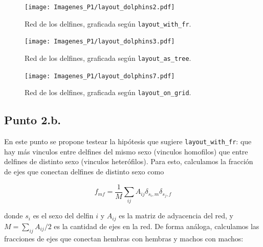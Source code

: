 \documentclass{article}
\begin{document}
\begin{figure}[!htb]
   \begin{minipage}{0.3\textwidth}
	\centering
	\texttt{[image: Imagenes\_P1/layout\_dolphins2.pdf]}
	\caption{Red de los delfines, graficada según \texttt{layout\_with\_fr}.}
	\label{pt2layoutsfr}
   \end{minipage}\hfill
   \begin{minipage}{0.3\textwidth}
	\centering
	\texttt{[image: Imagenes\_P1/layout\_dolphins3.pdf]}
	\caption{Red de los delfines, graficada seg\'un \texttt{layout\_as\_tree}.}
	\label{pt2layouttree}
   \end{minipage}\hfill
   \begin{minipage}{0.3\textwidth}
	\centering
	\texttt{[image: Imagenes\_P1/layout\_dolphins7.pdf]}
    \caption{Red de los delfines, graficada seg\'un \texttt{layout\_on\_grid}.}
	\label{pt2layoutgrid}
   \end{minipage}
\end{figure}


\subsection{Punto 2.b.}
En este punto se propone testear la hipótesis que sugiere \texttt{layout\_with\_fr}: que hay más vinculos entre delfines del mismo sexo (vinculos homofilos) que entre delfines de distinto sexo (vinculos heter\'ofilos). Para esto, calculamos la fracción de ejes que conectan delfines de distinto sexo como

\begin{equation}
    f_{mf} = \frac{1}{M}\sum_{ij} A_{ij} \delta_{s_i,m} \delta_{s_j,f}
\end{equation}

donde $s_i$ es el sexo del delfin $i$ y $A_{ij}$ es la matriz de adyacencia del red, y $M = \sum_{ij} A_{ij}/2$ es la cantidad de ejes en la red. De forma análoga, calculamos las fracciones de ejes que conectan hembras con hembras y machos con machos:
\end{document}
